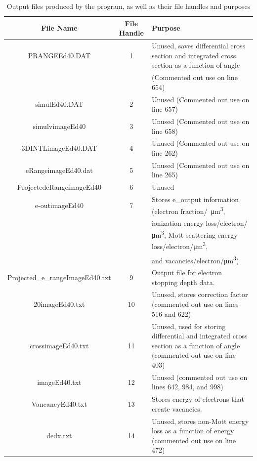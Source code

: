 \documentclass[10pt, reqno]{exam}
\begin{document}
{\begin{table}[h]
    \footnotesize
    \centering
    \caption{Output files produced by the program, as well as their file handles and purposes}
    \label{tbl:output files}
    \begin{tabular}{|c|c|l|}
        \hline
        File Name & File Handle & Purpose \\
        \hline
        PRANGEEd40.DAT  & 1 & Unused, saves differential cross section and integrated cross section as a function of angle \\
        &&  (Commented out use on line 654)  \\
        simulEd40.DAT   & 2 & Unused (Commented out use on line 657)  \\
        simulvimageEd40 & 3 & Unused (Commented out use on line 658)  \\
        3DINTLimageEd40.DAT & 4 & Unused (Commented out use on line 262)  \\
        eRangeimageEd40.dat & 5 & Unused (Commented out use on line 265)  \\
        ProjectedeRangeimageEd40    & 6 & Unused  \\
        e-outimageEd40  & 7 & Stores e\_output information (electron fraction\si{/\micro\meter^3}, \\
        && ionization energy loss/\si{electron/\micro\meter^3}, Mott scattering energy loss/electron/\si{\micro\meter^3},\\
        &&  and vacancies/electron/\si{\micro\meter^3}) \\
        Projected\_e\_rangeImageEd40.txt  & 9 & Output file for electron stopping depth data.  \\
        20imageEd40.txt & 10 &  Unused, stores correction factor (commented out use on lines 516 and 622) \\
        crossimageEd40.txt  & 11 & Unused, used for storing differential and integrated cross section as a function of angle (commented out use on line 403) \\
        imageEd40.txt   & 12 & Unused (commented out use on lines 642, 984, and 998) \\
        VancancyEd40.txt    & 13 & Stores energy of electrons that create vacancies.  \\
        dedx.txt    & 14 & Unused, stores non-Mott energy loss as a function of energy (commented out use on line 472)  \\
        \hline
    \end{tabular}
\end{table}

}
\end{document}
